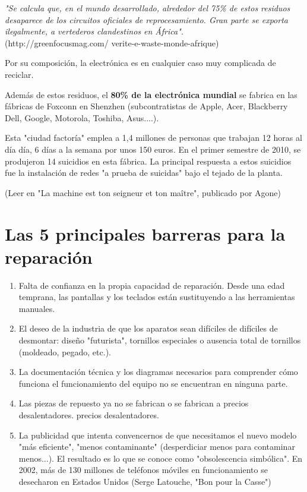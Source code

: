 \documentclass[a5paper,twoside,openany]{book}
\begin{document}
\textit{"Se calcula que, en el mundo desarrollado, alrededor del 75\% de estos residuos desaparece de los circuitos oficiales de reprocesamiento. Gran parte se exporta ilegalmente, a vertederos clandestinos en África".
}\\
(http://greenfocusmag.com/ verite-e-waste-monde-afrique)

Por su composición, la electrónica es en cualquier caso muy complicada de reciclar.

Además de estos residuos, el \textbf{80\% de la electrónica mundial} se fabrica
en las fábricas de Foxconn en Shenzhen (subcontratistas de Apple, Acer, Blackberry
Dell, Google, Motorola, Toshiba, Asus....).

Esta "ciudad factoría" emplea a 1,4 millones de personas que trabajan 12 horas al día
día, 6 días a la semana por unos 150 euros.
En el primer semestre de 2010, se produjeron 14 suicidios en esta
fábrica. La principal respuesta a estos suicidios fue la instalación de redes "a prueba de suicidas" bajo el tejado de la planta.

(Leer en "La machine est ton seigneur et ton maître", publicado por Agone)

\section{Las 5 principales barreras para la reparación}
\begin{enumerate}
\item Falta de confianza en la propia capacidad de reparación.
Desde una edad temprana, las pantallas y los teclados están sustituyendo a las herramientas manuales.
\item El deseo de la industria de que los aparatos sean difíciles de
difíciles de desmontar: diseño "futurista", tornillos especiales o ausencia total de tornillos (moldeado, pegado, etc.).
\item La documentación técnica y los diagramas necesarios para comprender cómo funciona el
funcionamiento del equipo no se encuentran en ninguna parte.
\item Las piezas de repuesto ya no se fabrican o se fabrican a precios desalentadores.
precios desalentadores.
\item La publicidad que intenta convencernos de que necesitamos el nuevo modelo "más eficiente", "menos contaminante" (desperdiciar menos para contaminar menos...).
El resultado es lo que se conoce como "obsolescencia simbólica".
En 2002, más de 130 millones de teléfonos móviles en funcionamiento
se desecharon en Estados Unidos (Serge Latouche, "Bon pour la
Casse")
\end{enumerate}
\end{document}
